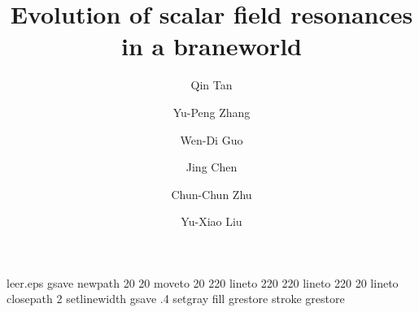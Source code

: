 \begin{filecontents*}{leer.eps}
gsave
newpath
  20 20 moveto
  20 220 lineto
  220 220 lineto
  220 20 lineto
closepath
2 setlinewidth
gsave
  .4 setgray fill
grestore
stroke
grestore
\end{filecontents*}
%
\RequirePackage{fix-cm}
%

\documentclass[twocolumn,epjc3,amssymb,eqsecnum,amsfonts,epsf,preprintnumbers,nofootinbib,superscriptaddress]{svjour3}
%
\smartqed
%
\RequirePackage{graphicx}
\usepackage{multirow}
\usepackage{amssymb,graphics}
\usepackage{graphics,epsfig,subfigure}
\usepackage{epstopdf}
\usepackage{graphicx}
\usepackage{dcolumn,color}
\usepackage{bm}
\usepackage{epsfig}
\usepackage{hyperref}
\usepackage{color,framed}
\usepackage{lipsum}
\usepackage{amsmath,amssymb,graphics,epsfig,subfigure,amsfonts,latexsym,color,makeidx}
\usepackage{cite}
\newcommand {\nn}    {\nonumber}







\renewcommand{\baselinestretch}{1.3}
\title{Evolution of scalar field resonances in a braneworld}

\author{Qin Tan
\and  Yu-Peng Zhang
\and  Wen-Di Guo
 \and Jing Chen
 \and Chun-Chun Zhu
\and Yu-Xiao Liu }




\date{}

\maketitle

